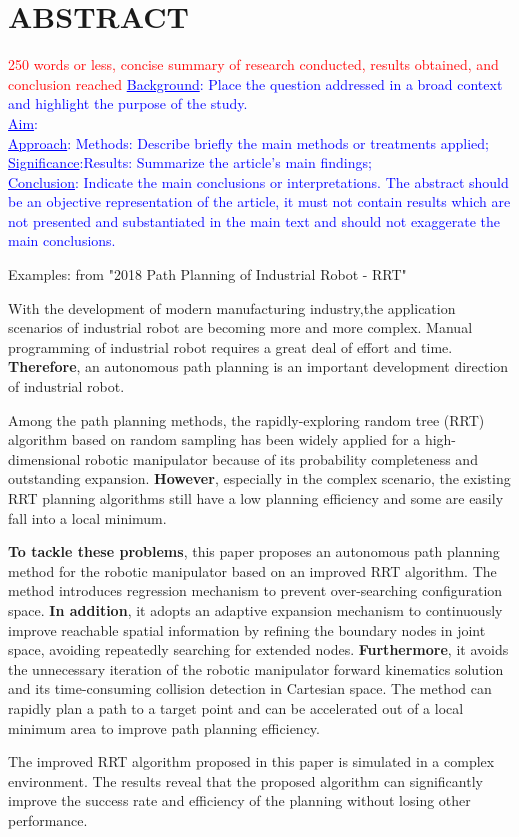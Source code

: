 
\noindent\section{ABSTRACT}
\textcolor{red}{250 words or less, concise summary of research conducted, results obtained, and conclusion reached}
\textcolor{blue}{\uline{Background}: Place the question addressed in a broad context and highlight the purpose of the study.}\\

\textcolor{blue}{\noindent\uline{Aim}: }\\

\textcolor{blue}{\noindent\uline{Approach}: Methods: Describe briefly the main methods or treatments applied;}\\

\textcolor{blue}{\noindent\uline{Significance}:Results: Summarize the article’s main findings;}\\ 

\textcolor{blue}{\noindent\uline{Conclusion}: Indicate the main conclusions or interpretations. The abstract should be an objective representation of the article, it must not contain results which are not presented and substantiated in the main text and should not exaggerate the main conclusions.}

Examples: from "2018 Path Planning of Industrial Robot - RRT"

With the development of modern manufacturing industry,the application scenarios of industrial robot are becoming more and more complex. Manual programming of industrial robot requires a great deal of effort and time. \textbf{Therefore}, an autonomous path planning is an important development direction of industrial robot. 

Among the path planning methods, the rapidly-exploring random tree (RRT) algorithm based on random sampling has been widely applied for a high-dimensional robotic manipulator because of its probability completeness and outstanding expansion. \textbf{However}, especially in the complex scenario, the existing RRT planning algorithms still have a low planning efficiency and some are easily fall into a local minimum. 

\textbf{To tackle these problems}, this paper proposes an autonomous path planning method for the robotic manipulator based on an improved RRT algorithm. The method introduces regression mechanism to prevent over-searching configuration space. 
\textbf{In addition}, it adopts an adaptive expansion mechanism to continuously improve reachable spatial information by refining the boundary nodes in joint space, avoiding repeatedly searching for extended nodes. 
\textbf{Furthermore}, it avoids the unnecessary iteration of the robotic manipulator forward kinematics solution and its time-consuming collision detection in Cartesian space. The method can rapidly plan a path to a target point and can be accelerated out of a local minimum area to improve path planning efficiency. 

The improved RRT algorithm proposed in this paper is simulated in a complex environment. The results reveal that the proposed algorithm can significantly improve the success rate and efficiency of the planning without losing other performance.\\